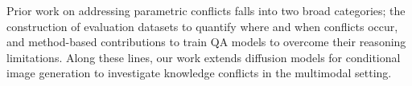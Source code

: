 
Prior work on addressing parametric conflicts falls into two broad categories; the construction of evaluation datasets to quantify where and when conflicts occur, and method-based contributions to train QA models to overcome their reasoning limitations. Along these lines, our work extends diffusion models for conditional image generation to investigate knowledge conflicts in the multimodal setting.


